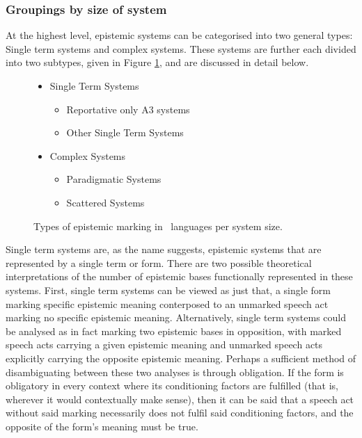 \subsubsection{Groupings by size of system}\label{sss:Description:GroupSize}
At the highest level, epistemic systems can be categorised into two general types: Single term systems and complex systems. These systems are further each divided into two subtypes, given in Figure \ref{f:Description:SizeTypes}, and are discussed in detail below.

\begin{figure}
        \begin{itemize}
                \item Single Term Systems
                \begin{itemize}
                        \item Reportative only A3 systems
                        \item Other Single Term Systems
                \end{itemize}
                \item Complex Systems
                \begin{itemize}
                        \item Paradigmatic Systems
                        \item Scattered Systems
                \end{itemize}
        \end{itemize}
        \caption{Types of epistemic marking in \lfam\ languages per system size.}\label{f:Description:SizeTypes}
\end{figure}

Single term systems are, as the name suggests, epistemic systems that are represented by a single term or form. There are two possible theoretical interpretations of the number of epistemic bases functionally represented in these systems. First, single term systems can be viewed as just that, a single form marking specific epistemic meaning conterposed to an unmarked speech act marking no specific epistemic meaning. Alternatively, single term systems could be analysed as in fact marking two epistemic bases in opposition, with marked speech acts carrying a given epistemic meaning and unmarked speech acts explicitly carrying the opposite epistemic meaning. Perhaps a sufficient method of disambiguating between these two analyses is through obligation. If the form is obligatory in every context where its conditioning factors are fulfilled (that is, wherever it would contextually make sense), then it can be said that a speech act without said marking necessarily does not fulfil said conditioning factors, and the opposite of the form's meaning must be true.

